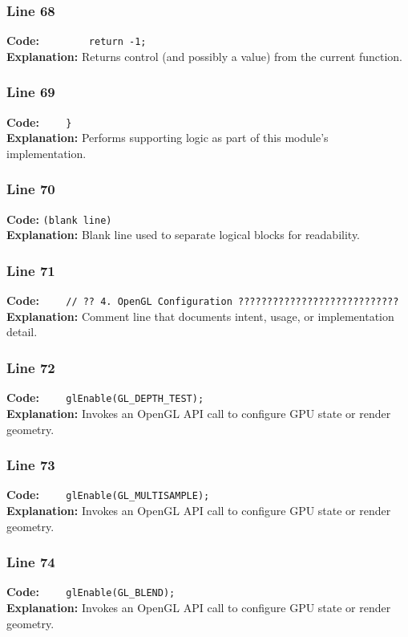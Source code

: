 \documentclass[11pt,a4paper]{article}
\begin{document}
\subsubsection*{Line 68}
\textbf{Code:} \verb|        return -1;|\\
\textbf{Explanation:} Returns control (and possibly a value) from the current function.

\subsubsection*{Line 69}
\textbf{Code:} \verb|    }|\\
\textbf{Explanation:} Performs supporting logic as part of this module's implementation.

\subsubsection*{Line 70}
\textbf{Code:} \texttt{(blank line)}\\
\textbf{Explanation:} Blank line used to separate logical blocks for readability.

\subsubsection*{Line 71}
\textbf{Code:} \verb|    // ?? 4. OpenGL Configuration ????????????????????????????|\\
\textbf{Explanation:} Comment line that documents intent, usage, or implementation detail.

\subsubsection*{Line 72}
\textbf{Code:} \verb|    glEnable(GL_DEPTH_TEST);|\\
\textbf{Explanation:} Invokes an OpenGL API call to configure GPU state or render geometry.

\subsubsection*{Line 73}
\textbf{Code:} \verb|    glEnable(GL_MULTISAMPLE);|\\
\textbf{Explanation:} Invokes an OpenGL API call to configure GPU state or render geometry.

\subsubsection*{Line 74}
\textbf{Code:} \verb|    glEnable(GL_BLEND);|\\
\textbf{Explanation:} Invokes an OpenGL API call to configure GPU state or render geometry.
\end{document}
